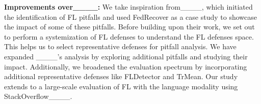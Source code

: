 \noindent\textbf{Improvements over____:} We take inspiration from____, which initiated the identification of FL pitfalls and used FedRecover as a case study to showcase the impact of some of these pitfalls. Before building upon their work, we set out to perform a systemization of FL defenses to understand the FL defenses space. This helps us to select representative defenses for pitfall analysis. We have expanded ____'s analysis by exploring additional pitfalls and studying their impact. Additionally, we broadened the evaluation spectrum by incorporating additional representative defenses like FLDetector and TrMean. Our study extends to a large-scale evaluation of FL with the language modality using StackOverflow____.